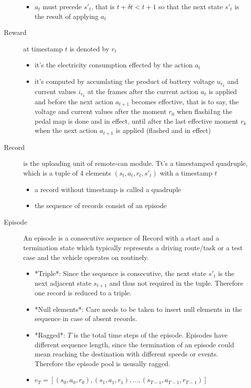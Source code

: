 \documentclass{article}
\begin{document}
\begin{description}
\begin{itemize}
		      \item $a_t$ must precede $s'_t$, that is $t+\delta t < t+1$ so that the next state $s'_t$ is the result of applying $a_t$
	      \end{itemize}
	\item[Reward] at timestamp $t$ is denoted by $r_t$
	      \begin{itemize}
		      \item it's the electricity consumption effected by the action $a_t$
		      \item it's computed by accumlating the product of battery voltage $u_{r_k}$ and current values $i_{r_k}$ at the frames after the current action $a_t$ is applied and before the next action $a_{t+1}$ becomes effective, that is to say, the voltage and current values after the moment $r_0$  when flashi1ng the pedal map is done and in effect, until after the last effective moment $r_k$  when the next action $a_{t+1}$ is applied (flashed and in effect)
	      \end{itemize}
	\item[Record] is the uploading unit of remote-can module. Tt's a timestamped quadruple, which is a tuple of 4 elements $(s_t, a_t, r_t, s'_t)$ with a timestamp $t$
	      \begin{itemize}
		      \item a record without timestamp is called a quadruple
		      \item the sequence of records consist of an episode
	      \end{itemize}
	\item[Episode] An episode is a consecutive sequence of Record with a start and a termination state which typically represents a driving route/task or a test case and the vehicle operates on routinely.
	      \begin{itemize}
		      \item *Triple*: Since the sequence is consecutive, the next state $s'_t$ is the next adjacent state $s_{t+1}$ and thus not required in the tuple. Therefore one record is reduced to a triple.
		      \item *Null elements*: Care needs to be taken to insert null elements in the sequence in case of absent records.
		      \item *Ragged*: $T$ is the total time steps of the episode. Episodes have different sequence length, since the termination of an episode could mean reaching the destination with different speeds or events. Therefore the episode pool  is ususally ragged.
		      \item $e_T=[(s_0,a_0,r_0),(s_1,a_1,r_1), \ldots,(s_{T-1},a_{T-1},r_{T-1})]$
	      \end{itemize}
\end{description}
\end{document}
